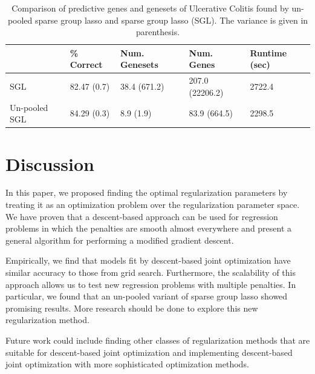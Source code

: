 \documentclass{statsoc}
\begin{document}
\begin{table}
\caption{\label{colitis} Comparison of predictive genes and genesets of Ulcerative Colitis found by un-pooled sparse group lasso and sparse group lasso (SGL). The variance is given in parenthesis.}
\centering
\begin{tabular}{| l | l | l | l | l | }
\hline
 & \% Correct  & Num. Genesets & Num. Genes & Runtime (sec) \\
\hline
SGL & 82.47 (0.7) & 38.4 (671.2) & 207.0 (22206.2) & 2722.4 \\
\hline
Un-pooled SGL & 84.29 (0.3) & 8.9 (1.9) & 83.9 (664.5) & 2298.5 \\
\hline
\end{tabular}
\end{table}

\section{Discussion}
In this paper, we proposed finding the optimal regularization parameters by treating it as an optimization problem over the regularization parameter space. We have proven that a descent-based approach can be used for regression problems in which the penalties are smooth almost everywhere and present a general algorithm for performing a modified gradient descent.

Empirically, we find that models fit by descent-based joint optimization have similar accuracy to those from grid search. Furthermore, the scalability of this approach allows us to test new regression problems with multiple penalties. In particular, we found that an un-pooled variant of sparse group lasso showed promising results. More research should be done to explore this new regularization method.

Future work could include finding other classes of regularization methods that are suitable for descent-based joint optimization and implementing descent-based joint optimization with more sophisticated optimization methods.

\bigskip


\end{document}
